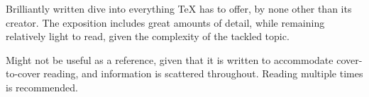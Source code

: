 Brilliantly written dive into everything \TeX{} has to offer, by none other than
its creator. The exposition includes great amounts of detail, while remaining
relatively light to read, given the complexity of the tackled topic.

Might not be useful as a reference, given that it is written to accommodate
cover-to-cover reading, and information is scattered throughout. Reading
multiple times is recommended.
